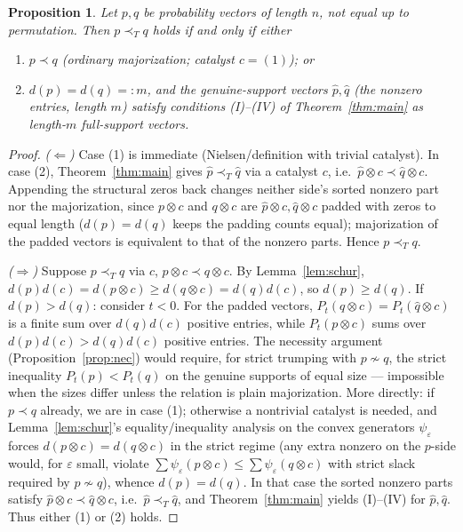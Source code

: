 \documentclass{amsart}
\theoremstyle{plain}
\newtheorem{proposition}{Proposition}
\theoremstyle{definition}
\newcommand{\maj}{\prec}
\newcommand{\trump}{\prec_T}
\begin{document}
\begin{proposition}\label{prop:supp}
Let $p,q$ be probability vectors of length $n$, not equal up to permutation. Then
$p\trump q$ holds if and only if either
\begin{enumerate}
\item $p\maj q$ (ordinary majorization; catalyst $c=(1)$); or
\item $d(p)=d(q)=:m$, and the genuine-support vectors $\hat p,\hat q$ (the nonzero
entries, length $m$) satisfy conditions \textnormal{(I)--(IV)} of
Theorem~\ref{thm:main} as length-$m$ full-support vectors.
\end{enumerate}
\end{proposition}
\begin{proof}
\emph{($\Leftarrow$)} Case (1) is immediate (Nielsen/definition with trivial catalyst).
In case (2), Theorem~\ref{thm:main} gives $\hat p\trump\hat q$ via a catalyst $c$, i.e.\
$\hat p\otimes c\maj\hat q\otimes c$. Appending the structural zeros back changes
neither side's sorted nonzero part nor the majorization, since $p\otimes c$ and
$q\otimes c$ are $\hat p\otimes c,\hat q\otimes c$ padded with zeros to equal length
($d(p)=d(q)$ keeps the padding counts equal); majorization of the padded vectors is
equivalent to that of the nonzero parts. Hence $p\trump q$.

\emph{($\Rightarrow$)} Suppose $p\trump q$ via $c$, $p\otimes c\maj q\otimes c$. By
Lemma~\ref{lem:schur}, $d(p)d(c)=d(p\otimes c)\ge d(q\otimes c)=d(q)d(c)$, so
$d(p)\ge d(q)$. If $d(p)>d(q)$: consider $t<0$. For the padded vectors,
$P_t(q\otimes c)=P_t(\hat q\otimes c)$ is a finite sum over $d(q)d(c)$ positive
entries, while $P_t(p\otimes c)$ sums over $d(p)d(c)>d(q)d(c)$ positive entries. The
necessity argument (Proposition~\ref{prop:nec}) would require, for strict trumping with
$p\not\sim q$, the strict inequality $P_t(p)<P_t(q)$ on the genuine supports of equal
size — impossible when the sizes differ unless the relation is plain majorization. More
directly: if $p\maj q$ already, we are in case (1); otherwise a nontrivial catalyst is
needed, and Lemma~\ref{lem:schur}'s equality/inequality analysis on the convex
generators $\psi_\varepsilon$ forces $d(p\otimes c)=d(q\otimes c)$ in the strict regime
(any extra nonzero on the $p$-side would, for $\varepsilon$ small, violate
$\sum\psi_\varepsilon(p\otimes c)\le\sum\psi_\varepsilon(q\otimes c)$ with strict slack
required by $p\not\sim q$), whence $d(p)=d(q)$. In that case the sorted nonzero parts
satisfy $\hat p\otimes c\maj\hat q\otimes c$, i.e.\ $\hat p\trump\hat q$, and
Theorem~\ref{thm:main} yields (I)--(IV) for $\hat p,\hat q$. Thus either (1) or (2)
holds.
\end{proof}
\end{document}
